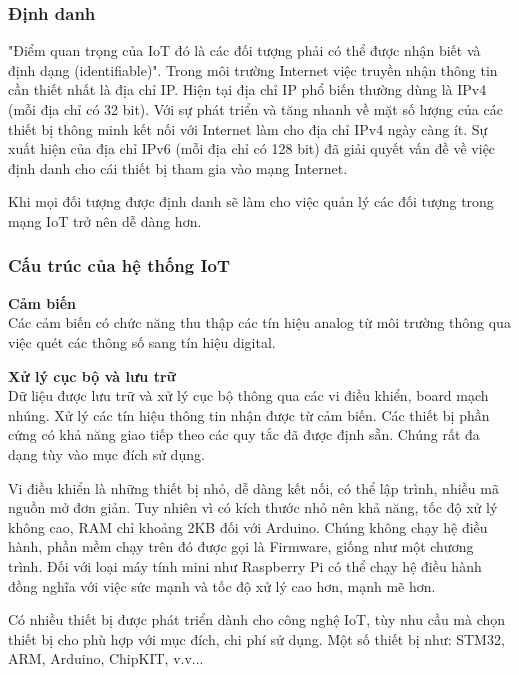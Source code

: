 \documentclass[a4paper,12pt,oneside]{article}
\begin{document}
\subsubsection{Định danh}

\noindent "Điểm quan trọng của IoT đó là các đối tượng phải có thể được nhận biết và định dạng (identifiable)"\cite{iot}. Trong môi trường Internet việc truyền nhận thông tin cần thiết nhất là địa chỉ IP. Hiện tại địa chỉ IP phổ biến thường dùng là IPv4 (mỗi địa chỉ có 32 bit). Với sự phát triển và tăng nhanh về mặt số lượng của các thiết bị thông minh kết nối với Internet làm cho địa chỉ IPv4 ngày càng ít. Sự xuất hiện của địa chỉ IPv6 (mỗi địa chỉ có 128 bit) đã giải quyết vấn đề về việc định danh cho cái thiết bị tham gia vào mạng Internet. 

\noindent Khi mọi đối tượng được định danh sẽ làm cho việc quản lý các đối tượng trong mạng IoT trở nên dễ dàng hơn.

\subsubsection{Cấu trúc của hệ thống IoT\cite{cautruciot}}

\noindent \textbf{Cảm biến}\\
\noindent Các cảm biến có chức năng thu thập các tín hiệu analog từ môi trường thông qua việc quét các thông số sang tín hiệu digital.

\noindent \textbf{Xử lý cục bộ và lưu trữ}\\
\noindent Dữ liệu được lưu trữ và xử lý cục bộ thông qua các vi điều khiển, board mạch nhúng. Xử lý các tín hiệu thông tin nhận được từ cảm biến. Các thiết bị phần cứng có khả năng giao tiếp theo các quy tắc đã được định sẵn. Chúng rất đa dạng tùy vào mục đích sử dụng.

\noindent Vi điều khiển là những thiết bị nhỏ, dễ dàng kết nối, có thể lập trình, nhiều mã nguồn mở đơn giản. Tuy nhiên vì có kích thước nhỏ nên khả năng, tốc độ xử lý không cao, RAM chỉ khoảng 2KB đối với Arduino. Chúng không chạy hệ điều hành, phần mềm chạy trên đó được gọi là Firmware, giống như một chương trình. Đối với loại máy tính mini như Raspberry Pi có thể chạy hệ điều hành đồng nghĩa với việc sức mạnh và tốc độ xử lý cao hơn, mạnh mẽ hơn.

\noindent Có nhiều thiết bị được phát triển dành cho công nghệ IoT, tùy nhu cầu mà chọn thiết bị cho phù hợp với mục đích, chi phí sử dụng. Một số thiết bị như: STM32, ARM, Arduino, ChipKIT, v.v...
\end{document}
